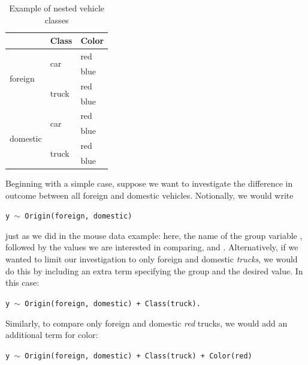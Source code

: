 \begin{table}[H]
\centering
\def\arraystretch{1.5}
\begin{tabular}{|p{0.9in}|p{0.9in}|p{0.9in}|} \hline 
\rowcolor{lightgray} \multicolumn{1}{|c|}{Origin} & \multicolumn{1}{c|}{Class} & \multicolumn{1}{c|}{Color}\\
\hline
\multirow{4}{*}{foreign} & \multirow{2}{*}{car} & red \\
\hhline{~~-}
& & blue \\
\hhline{~--}
& \multirow{2}{*}{truck} & red \\
\hhline{~~-}
& & blue \\
\hline
\multirow{4}{*}{domestic} & \multirow{2}{*}{car} & red \\
\hhline{~~-}
& & blue \\
\hhline{~--}
& \multirow{2}{*}{truck} & red \\
\hhline{~~-}
& & blue \\
\hline
\end{tabular}
\caption{Example of nested vehicle classes}
\label{tab:vehicle}
\end{table}


Beginning with a simple case, suppose we want to investigate the difference in outcome between all foreign and domestic vehicles. Notionally, we would write

\begin{center}
\tt y $\sim$ Origin(foreign, domestic)
\end{center}

just as we did in the mouse data example: here, the name of the group variable , followed by the values we are interested in comparing,  and . Alternatively, if we wanted to limit our investigation to only foreign and domestic \textit{trucks}, we would do this by including an extra term specifying the group and the desired value. In this case:

\begin{center}
\tt y $\sim$ Origin(foreign, domestic) + Class(truck).
\end{center}

Similarly, to compare only foreign and domestic \textit{red} trucks, we would add an additional term for color:

\begin{center}
\tt y $\sim$ Origin(foreign, domestic) + Class(truck) + Color(red)
\end{center}

